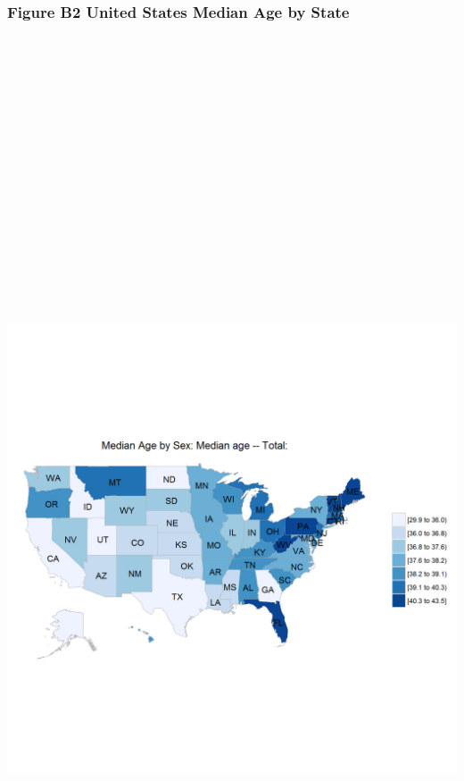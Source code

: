\documentclass[]{article}
\begin{document}
\newpage

\subsubsection{Figure B2 United States Median Age by
State}\label{figure-b2-united-states-median-age-by-state}

\section{\texorpdfstring{\protect\includegraphics[height=12.50000in]{images/state_age.png}}{US Median Age by State}}\label{us-median-age-by-state}
\end{document}
